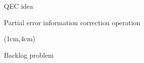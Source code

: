 \documentclass{dfki}
\begin{document}
\begin{frame}{QEC idea}
\begin{center}
		Partial error information
		\hspace{0.5cm}
		\hspace{0.5cm}
		correction operation
	\end{center}
	\pause
	\begin{textblock*}{3.5cm}(1cm,4cm)
		\begin{tcolorbox}[colback=osakared!5!white, colframe=osakared, width=4cm, arc=2mm]
			\center
			Backlog problem
		\end{tcolorbox}
	\end{textblock*}
\end{frame}
\end{document}
